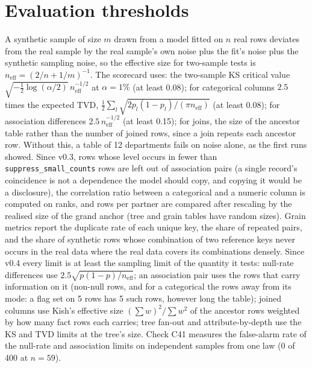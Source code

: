 \documentclass[11pt,a4paper]{article}
\theoremstyle{definition}
\theoremstyle{remark}
\begin{document}

































\section{Evaluation thresholds}\label{sec:thresholds}
A synthetic sample of size $m$ drawn from a model fitted on $n$ real rows deviates from the real sample by the real sample's own noise plus the fit's noise plus the synthetic sampling noise, so the effective size for two-sample tests is $n_\text{eff}=(2/n+1/m)^{-1}$. The scorecard uses: the two-sample KS critical value $\sqrt{-\tfrac12\log(\alpha/2)}\,n_\text{eff}^{-1/2}$ at $\alpha=1\%$ (at least 0.08); for categorical columns $2.5$ times the expected TVD, $\tfrac12\sum_l\sqrt{2p_l(1-p_l)/(\pi n_\text{eff})}$ (at least 0.08); for association differences $2.5\,n_\text{eff}^{-1/2}$ (at least 0.15); for joins, the size of the ancestor table rather than the number of joined rows, since a join repeats each ancestor row. Without this, a table of 12 departments fails on noise alone, as the first runs showed. Since v0.3, rows whose level occurs in fewer than \texttt{suppress\_small\_counts} rows are left out of association pairs (a single record's coincidence is not a dependence the model should copy, and copying it would be a disclosure), the correlation ratio between a categorical and a numeric column is computed on ranks, and rows per partner are compared after rescaling by the realised size of the grand anchor (tree and grain tables have random sizes). Grain metrics report the duplicate rate of each unique key, the share of repeated pairs, and the share of synthetic rows whose combination of two reference keys never occurs in the real data where the real data covers its combinations densely. Since v0.4 every limit is at least the sampling limit of the quantity it tests: null-rate differences use $2.5\sqrt{p(1-p)/n_\text{eff}}$; an association pair uses the rows that carry information on it (non-null rows, and for a categorical the rows away from its mode: a flag set on 5 rows has 5 such rows, however long the table); joined columns use Kish's effective size $(\sum w)^2/\sum w^2$ of the ancestor rows weighted by how many fact rows each carries; tree fan-out and attribute-by-depth use the KS and TVD limits at the tree's size. Check C41 measures the false-alarm rate of the null-rate and association limits on independent samples from one law (0 of 400 at $n=59$).
\end{document}
